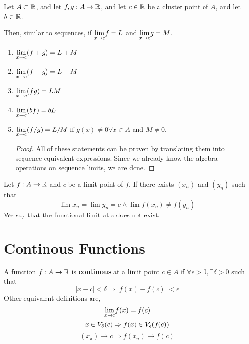 \begin{theorem}
    Let $A \subset {\mathbb{R}}$, and let $f,g: A \to {\mathbb{R}}$, and let $c \in {\mathbb{R}}$ be a cluster point of $A$, and let $b \in {\mathbb{R}}$.
    
    Then, similar to sequences, if $\underset{x \to c}{\lim}f = L$ and $\underset{x \to c}{\lim}g = M$.
    \begin{enumerate}
        \item $\underset{x \to c}{\lim} (f+g) = L + M$
        \item $\underset{x \to c}{\lim} (f-g) = L - M$ 
        \item $\underset{x \to c}{\lim} (fg) = LM$ 
        \item $\underset{x \to c}{\lim} (bf) = bL$
        \item $\underset{x \to c}{\lim} (f/g) = L/M$ if $g(x) \neq 0  \forall x \in A$ and $M \neq 0$.
    \begin{proof}
        All of these statements can be proven by translating them into sequence equivalent expressions. Since we already know the algebra operations on sequence limits, we are done.
    \end{proof}
    \end{enumerate}
\end{theorem}

\begin{definition}
    Let $f: A \to {\mathbb{R}}$ and $c$ be a limit point of $f$. If there exists $(x_n)$ and $(y_n)$ such that
    \[ \lim x_n = \lim y_n = c \land \lim f(x_n) \neq f(y_n)\]
    We say that the functional limit at $c$ does not exist.
\end{definition}
\section{Continous Functions}
\begin{definition}
    A function $f: A \to {\mathbb{R}}$ is \textbf{continous} at a limit point $c \in A$ if $\forall \epsilon >0, \exists \delta >0$ such that
    \[ |x-c|< \delta \Rightarrow |f(x) - f(c)| <\epsilon\]
    Other equivalent definitions are,
    \[\underset{x \to c}{\lim}f(x) = f(c)\]
    \[ x \in V_{\delta}(c) \Rightarrow f(x) \in V_{\epsilon}(f(c))\]
    \[ (x_n) \to c \Rightarrow f(x_n) \to f(c)\]
\end{definition}

